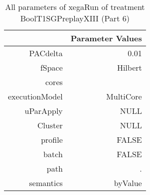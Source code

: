 \begin{table}[ht]
\centering
\begin{tabular}{rr}
  \hline
 & Parameter Values \\ 
  \hline
PACdelta & 0.01 \\ 
  fSpace & Hilbert \\ 
  cores &  \\ 
  executionModel & MultiCore \\ 
  uParApply & NULL \\ 
  Cluster & NULL \\ 
  profile & FALSE \\ 
  batch & FALSE \\ 
  path & . \\ 
  semantics & byValue \\ 
   \hline
\end{tabular}
\caption{ All parameters of xegaRun of treatment BoolT1SGPreplayXIII 
 (Part 6)} 
\end{table}
